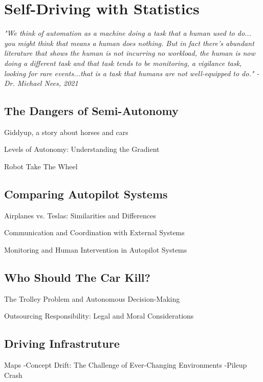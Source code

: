 \setchapterpreamble[u]{\margintoc}
\chapter{Self-Driving with Statistics}

\textit{"We think of automation as a machine doing a task that a human used to do... you might think that means a human does nothing. But in fact there's abundant literature that shows the human is not incurring no workload, the human is now doing a different task and that task tends to be monitoring, a vigilance task, looking for rare events...that is a task that humans are not well-equipped to do." - Dr. Michael Nees, 2021} \cite{nees2021}


\section{The Dangers of Semi-Autonomy}

Giddyup, a story about horses and cars

Levels of Autonomy: Understanding the Gradient

Robot Take The Wheel \cite{torchinskyboeckmann2019}


\section{Comparing Autopilot Systems}

Airplanes vs. Teslas: Similarities and Differences

Communication and Coordination with External Systems

Monitoring and Human Intervention in Autopilot Systems

\section{Who Should The Car Kill?}

The Trolley Problem and Autonomous Decision-Making

Outsourcing Responsibility: Legal and Moral Considerations

\section{Driving Infrastruture}

Maps
-Concept Drift: The Challenge of Ever-Changing Environments
-Pileup Crash \cite{pileupcrash}

